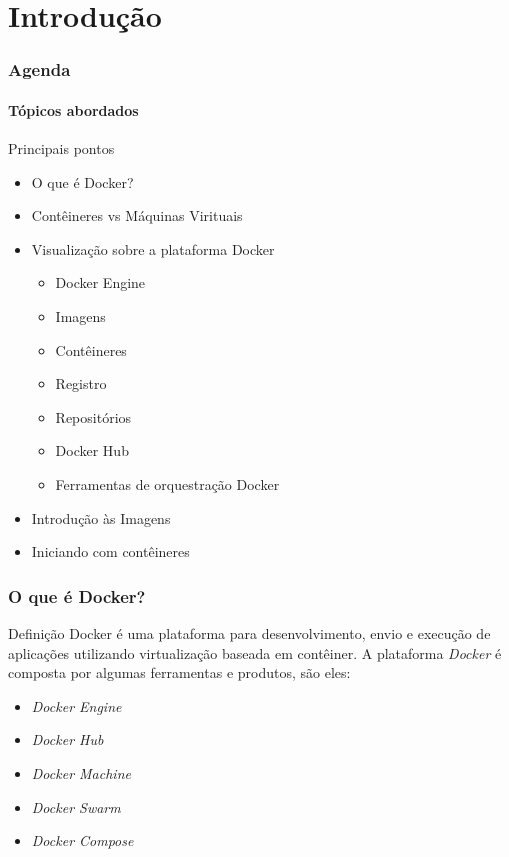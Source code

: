 \documentclass[12pt]{beamer}
\begin{document}
\section{Introdução}
\begin{frame}
  \frametitle{Agenda}
  \framesubtitle{Tópicos abordados}
  \begin{block}{Principais pontos}
					\begin{itemize}
									\item <2->O que é Docker?
									\item <3->Contêineres vs Máquinas Virituais
									\item <4->Visualização sobre a plataforma Docker
													\begin{itemize}
																	\item <5->Docker Engine
																	\item <6->Imagens
																	\item <7->Contêineres
																	\item <8->Registro
																	\item <9->Repositórios
																	\item <10->Docker Hub
																	\item <11->Ferramentas de orquestração Docker
													\end{itemize}
									\item <12->Introdução às Imagens
									\item <13->Iniciando com contêineres
  				\end{itemize}
  \end{block}
\end{frame}

\begin{frame}
  \frametitle{O que é Docker?}
  \begin{block}{Definição}
					Docker é uma plataforma para desenvolvimento, envio e execução de
					aplicações utilizando virtualização baseada em contêiner.
					A plataforma \emph{Docker} é composta por algumas ferramentas e
					produtos, são eles:
  \begin{itemize}
					\item <2->\emph{Docker Engine}
					\item <3->\emph{Docker Hub}
					\item <4->\emph{Docker Machine}
					\item <5->\emph{Docker Swarm}
					\item <6->\emph{Docker Compose}
  \end{itemize}
  \end{block}
\end{frame}
\end{document}
